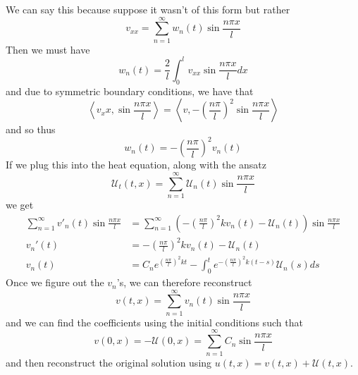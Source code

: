 \documentclass{article}
\newcommand{\ip}[2]{\left\langle #1,#2\right\rangle}
\theoremstyle{definition}
\begin{document}
We can say this because suppose it wasn't of this form but rather 
\begin{equation*}
    v_{xx}=\sum^\infty_{n=1}w_n(t)\sin \frac{n\pi x}{l}
\end{equation*}
Then we must have 
\begin{equation*}
    w_n(t) = \frac{2}{l}\int^l_0v_{xx}\sin \frac{n\pi x}{l}dx
\end{equation*}
and due to symmetric boundary conditions, we have that 
\begin{equation*}
    \ip{v_xx}{\sin\frac{n\pi x}{l}} = \ip{v}{-\left( \frac{n\pi}{l}\right)^2\sin \frac{n\pi x}{l}}
\end{equation*}
and so thus 
\begin{equation*}
    w_n(t) = -\left( \frac{n\pi}{l}\right)^2v_n(t)
\end{equation*}
If we plug this into the heat equation, along with the ansatz 
\begin{equation*}
    \mathcal{U}_t (t,x) = \sum ^\infty_{n=1} \mathcal{U}_n(t) \sin \frac{n\pi x}{l}
\end{equation*}
we get 
\begin{equation*}
    \begin{split}
        \sum^\infty_{n=1}v'_n(t) \sin \frac{n\pi x}{l} &=  \sum^\infty_{n=1} \left( - \left( \frac{n\pi }{l}\right)^2 k v_n(t)- \mathcal{U}_n(t) \right) \sin \frac{n\pi x}{l} \\
        v_n'(t) &= -\left( \frac{n\pi }{l} \right)^2kv_n(t)- \mathcal{U}_n(t) \\
        v_n(t)&= C_ne^{(\frac{n\pi}{l})^2kt } - \int^t_0e^{-(\frac{n \pi}{l})^2k(t-s)} \mathcal{U}_n(s)ds
    \end{split}
\end{equation*}
Once we figure out the $v_n$'s, we can therefore reconstruct 
\begin{equation*}
    v(t,x) = \sum^\infty_{n=1}v_n(t) \sin \frac{n\pi x}{l}
\end{equation*}
and we can find the coefficients using the initial conditions such that 
\begin{equation*}
    v(0,x)=-\mathcal{U}(0,x) = \sum^\infty_{n=1}C_n \sin \frac{n\pi x}{l}
\end{equation*}
and then reconstruct the original solution using $u(t,x)=v(t,x)+\mathcal{U}(t,x)$.
\end{document}
